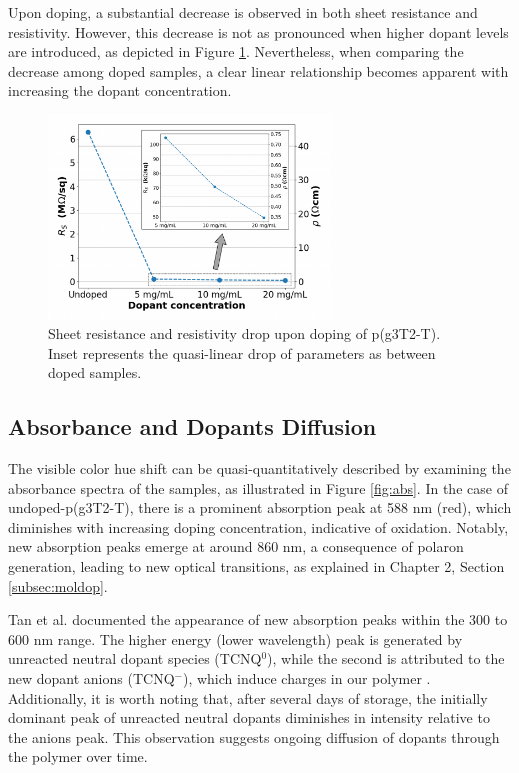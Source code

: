 Upon doping, a substantial decrease is observed in both sheet resistance and resistivity. However, this decrease is not as pronounced when higher dopant levels are introduced, as depicted in Figure \ref{fig:rho}. Nevertheless, when comparing the decrease among doped samples, a clear linear relationship becomes apparent with increasing the dopant concentration. 

\begin{figure}[ht]
  \centering
  \includegraphics[width=7.5cm]{Images/pdf/resist+inlet.pdf}
  \caption[Sheet resistance and resistivity drop upon doping]{Sheet resistance and resistivity drop upon doping of p(g3T2-T). Inset represents the quasi-linear drop of parameters as between doped samples.}
  \label{fig:rho}
\end{figure}

\subsection{Absorbance and Dopants Diffusion}
The visible color hue shift can be quasi-quantitatively described by examining the absorbance spectra of the samples, as illustrated in Figure \ref{fig:abs}. In the case of undoped-p(g3T2-T), there is a prominent absorption peak at 588 nm (red), which diminishes with increasing doping concentration, indicative of oxidation. Notably, new absorption peaks emerge at around 860 nm, a consequence of polaron generation, leading to new optical transitions, as explained in Chapter 2, Section \ref{subsec:moldop}. 

Tan et al. documented the appearance of new absorption peaks within the 300 to 600 nm range. The higher energy (lower wavelength) peak is generated by unreacted neutral dopant species (TCNQ$^{0}$), while the second is attributed to the new dopant anions (TCNQ$^{-}$), which induce charges in our polymer \cite{tanTuningOrganicElectrochemical2022}. Additionally, it is worth noting that, after several days of storage, the initially dominant peak of unreacted neutral dopants diminishes in intensity relative to the anions peak. This observation suggests ongoing diffusion of dopants through the polymer over time. 

